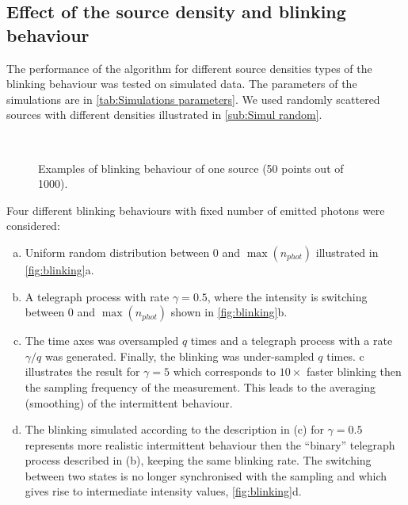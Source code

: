 \subsection{Effect of the source density and blinking behaviour \label{sub:results - blinking behaviour}}
The performance of the algorithm for different source densities types of the blinking behaviour was tested on simulated data. The parameters of the simulations are in \autoref{tab:Simulations parameters}. We used randomly scattered sources with different densities illustrated in \autoref{sub:Simul random}.

\begin{figure}[!h]
	\centering
	\newcommand{\sizef}{.35}
	\\
	\subfloat[telegraph oversampled ($\gamma=5$)]{
	\texttt{[image: \\qd S455/images/blinkmatS565]}} %
	\caption{Examples of blinking behaviour of one source (50 points out of 1000).}
	\label{fig:blinking}
\end{figure}

Four different blinking behaviours with fixed number of emitted photons were considered: 
%
\begin{enumerate}[(a)]
	\item
	Uniform random distribution between $0$ and $\max(n_{phot})$ illustrated in  \autoref{fig:blinking}a. 
	\item
	A telegraph process with rate $\gamma=0.5$, where the intensity is switching between $0$ and $\max(n_{phot})$ shown in \autoref{fig:blinking}b.
	\item
	The time axes was oversampled $q$ times and a telegraph process with a rate $\gamma/q$ was generated. Finally, the blinking was under-sampled $q$ times. c illustrates the result for $\gamma=5$ which corresponds to $10\times$ faster blinking then the sampling frequency of the measurement. This leads to the averaging (smoothing) of the intermittent behaviour.
	\item
	The blinking simulated according to the description in (c) for $\gamma=0.5$ represents more realistic intermittent behaviour then the ``binary'' telegraph process described in (b), keeping the same blinking rate. The switching between two states is no longer synchronised with the sampling and which gives rise to intermediate intensity values, \autoref{fig:blinking}d. 
\end{enumerate}
	
